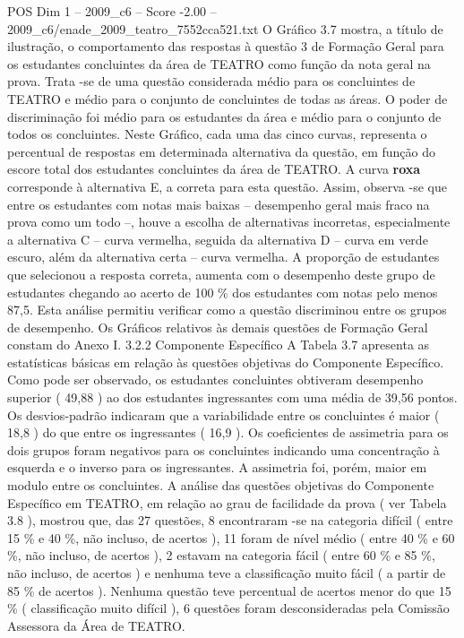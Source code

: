 \begin{textsample}{POS Dim 1 – 2009\_c6 – Score -2.00 – 2009\_c6/enade\_2009\_teatro\_7552cca521.txt}
O Gráfico 3.7 mostra, a título de ilustração, o comportamento das respostas à questão 3 de Formação Geral para os estudantes concluintes da área de TEATRO como função da nota geral na prova.
Trata -se de uma questão considerada médio para os concluintes de TEATRO e médio para o conjunto de concluintes de todas as áreas.
O poder de discriminação foi médio para os estudantes da área e médio para o conjunto de todos os concluintes.
Neste Gráfico, cada uma das cinco curvas, representa o percentual de respostas em determinada alternativa da questão, em função do escore total dos estudantes concluintes da área de TEATRO.
A curva \textbf{roxa} corresponde à alternativa E, a correta para esta questão.
Assim, observa -se que entre os estudantes com notas mais baixas – desempenho geral mais fraco na prova como um todo –, houve a escolha de alternativas incorretas, especialmente a alternativa C – curva vermelha, seguida da alternativa D – curva em verde escuro, além da alternativa certa – curva vermelha.
A proporção de estudantes que selecionou a resposta correta, aumenta com o desempenho deste grupo de estudantes chegando ao acerto de 100 \% dos estudantes com notas pelo menos 87,5.
Esta análise permitiu verificar como a questão discriminou entre os grupos de desempenho.
Os Gráficos relativos às demais questões de Formação Geral constam do Anexo I. 3.2.2 Componente Específico A Tabela 3.7 apresenta as estatísticas básicas em relação às questões objetivas do Componente Específico.
Como pode ser observado, os estudantes concluintes obtiveram desempenho superior ( 49,88 ) ao dos estudantes ingressantes com uma média de 39,56 pontos.
Os desvios-padrão indicaram que a variabilidade entre os concluintes é maior ( 18,8 ) do que entre os ingressantes ( 16,9 ).
Os coeficientes de assimetria para os dois grupos foram negativos para os concluintes indicando uma concentração à esquerda e o inverso para os ingressantes.
A assimetria foi, porém, maior em modulo entre os concluintes.
A análise das questões objetivas do Componente Específico em TEATRO, em relação ao grau de facilidade da prova ( ver Tabela 3.8 ), mostrou que, das 27 questões, 8 encontraram -se na categoria difícil ( entre 15 \% e 40 \%, não incluso, de acertos ), 11 foram de nível médio ( entre 40 \% e 60 \%, não incluso, de acertos ), 2 estavam na categoria fácil ( entre 60 \% e 85 \%, não incluso, de acertos ) e nenhuma teve a classificação muito fácil ( a partir de 85 \% de acertos ).
Nenhuma questão teve percentual de acertos menor do que 15 \% ( classificação muito difícil ), 6 questões foram desconsideradas pela Comissão Assessora da Área de TEATRO.

\end{textsample}
